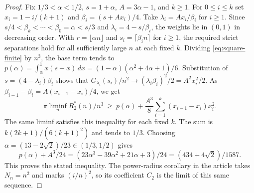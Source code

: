\begin{proof}
Fix $1/3<\alpha<1/2$, $s=1+\alpha$, $A=3\alpha-1$, and $k\ge1$.
For $0\le i\le k$ set $x_i=1-i/(k+1)$ and
$\beta_i=(s+Ax_i)/4$. Take $\lambda_i=Ax_i/\beta_i$ for $i\ge1$.
Since $s/4<\beta_k<\cdots<\beta_0=\alpha<s/3$ and
$\lambda_i=4-s/\beta_i$, the weights lie in $(0,1)$ in decreasing order.
With $r=\lfloor\alpha n\rfloor$ and $s_i=\lceil\beta_i n\rceil$
for $i\ge1$, the required strict separations hold for all sufficiently
large $n$ at each fixed $k$. Dividing \eqref{eq:square-finite} by $n^3$,
the base term tends to
$p(\alpha)=\int_\alpha^1 x(s-x)\,dx
=(1-\alpha)(\alpha^2+4\alpha+1)/6$. Substitution of
$s=(4-\lambda_i)\beta_i$ shows that
$G_{\lambda_i}(s_i)/n^2\to(\lambda_i\beta_i)^2/2=A^2x_i^2/2$.
As $\beta_{i-1}-\beta_i=A(x_{i-1}-x_i)/4$, we get
\[
 \pi\liminf_n R_2^*(n)/n^3 \ \ge\
 p(\alpha)+\frac{A^3}{8}\sum_{i=1}^k(x_{i-1}-x_i)x_i^2 .
\]
The same liminf satisfies this inequality for each fixed $k$. The sum
is $k(2k+1)/(6(k+1)^2)$ and tends to $1/3$. Choosing
$\alpha=(13-2\sqrt2)/23\in(1/3,1/2)$ gives
\[
 p(\alpha)+A^3/24
 = (23\alpha^3-39\alpha^2+21\alpha+3)/24
 = (434+4\sqrt2)/1587 .
\]
This proves the stated inequality. The power-radius corollary in the
article takes $N_n=n^2$ and marks $(i/n)^2$, so its coefficient $C_2$
is the limit of this same sequence.
\end{proof}
